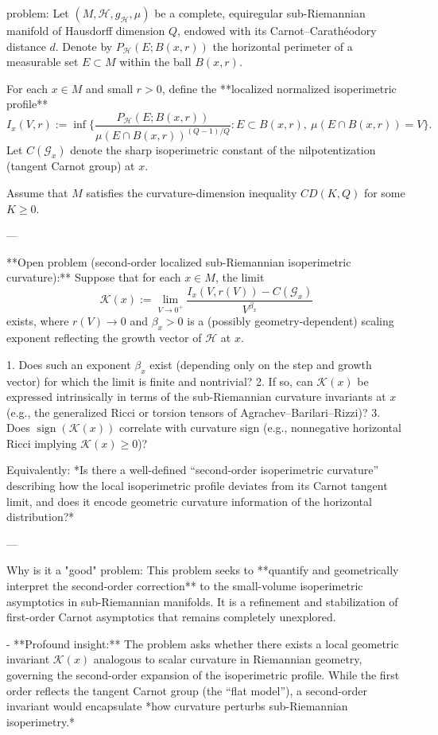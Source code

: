 problem:  
Let \((M, \mathcal{H}, g_{\mathcal{H}}, \mu)\) be a complete, equiregular sub-Riemannian manifold of Hausdorff dimension \(Q\), endowed with its Carnot–Carathéodory distance \(d\). Denote by \(P_{\mathcal{H}}(E; B(x,r))\) the horizontal perimeter of a measurable set \(E \subset M\) within the ball \(B(x,r)\).  

For each \(x \in M\) and small \(r>0\), define the **localized normalized isoperimetric profile**
\[
I_x(V, r)
:= \inf\Big\{ \frac{P_{\mathcal{H}}(E; B(x, r))}{\mu(E\cap B(x, r))^{(Q-1)/Q}}
: E \subset B(x, r),\ \mu(E\cap B(x, r)) = V \Big\}.
\]
Let \(C(\mathcal{G}_x)\) denote the sharp isoperimetric constant of the nilpotentization (tangent Carnot group) at \(x\).  

Assume that \(M\) satisfies the curvature-dimension inequality \(CD(K,Q)\) for some \(K \ge 0\).  

---

**Open problem (second-order localized sub-Riemannian isoperimetric curvature):**  
Suppose that for each \(x \in M\), the limit
\[
\mathcal{K}(x)
:= \lim_{V\to 0^+} \frac{I_x(V, r(V)) - C(\mathcal{G}_x)}{V^{\beta_x}}
\]
exists, where \(r(V) \to 0\) and \(\beta_x > 0\) is a (possibly geometry-dependent) scaling exponent reflecting the growth vector of \(\mathcal{H}\) at \(x\).  

1. Does such an exponent \(\beta_x\) exist (depending only on the step and growth vector) for which the limit is finite and nontrivial?  
2. If so, can \(\mathcal{K}(x)\) be expressed intrinsically in terms of the sub-Riemannian curvature invariants at \(x\) (e.g., the generalized Ricci or torsion tensors of Agrachev–Barilari–Rizzi)?  
3. Does \(\operatorname{sign}(\mathcal{K}(x))\) correlate with curvature sign (e.g., nonnegative horizontal Ricci implying \(\mathcal{K}(x) \ge 0\))?  

Equivalently: *Is there a well-defined “second-order isoperimetric curvature” describing how the local isoperimetric profile deviates from its Carnot tangent limit, and does it encode geometric curvature information of the horizontal distribution?*

---

Why is it a "good" problem:  
This problem seeks to **quantify and geometrically interpret the second-order correction** to the small-volume isoperimetric asymptotics in sub-Riemannian manifolds. It is a refinement and stabilization of first-order Carnot asymptotics that remains completely unexplored.

- **Profound insight:**  
  The problem asks whether there exists a local geometric invariant \(\mathcal{K}(x)\) analogous to scalar curvature in Riemannian geometry, governing the second-order expansion of the isoperimetric profile. While the first order reflects the tangent Carnot group (the “flat model”), a second-order invariant would encapsulate *how curvature perturbs sub-Riemannian isoperimetry.*

